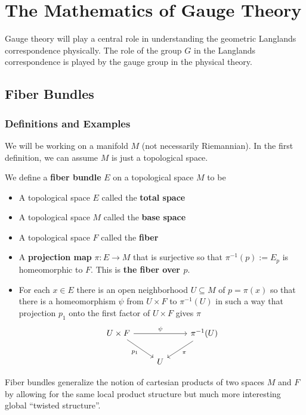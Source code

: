 \chapter{The Mathematics of Gauge Theory\label{ch:gauge}}

	Gauge theory will play a central role in understanding the geometric Langlands correspondence physically. The role of the group $G$ in the Langlands correspondence is played by the gauge group in the physical theory. 

	\section{Fiber Bundles}
	\subsection{Definitions and Examples} %
	\label{sub:definitions_and_examples}
	
	
		We will be working on a manifold $M$ (not necessarily Riemannian). In the first definition, we can assume $M$ is just a topological space. 
	\begin{defn}
		We define a \textbf{fiber bundle} $E$ on a topological space $M$ to be
		\begin{itemize}
			\item A topological space $E$ called the \textbf{total space}
			\item A topological space $M$ called the \textbf{base space}
			\item A topological space $F$ called the \textbf{fiber} 
			\item A \textbf{projection map} $\pi: E \to M$ that is surjective so that $\pi^{-1}(p) := E_p$ is homeomorphic to $F$. This is \textbf{the fiber over $p$}.
			\item For each $x \in E$ there is an open neighborhood $U \subseteq M$ of $p = \pi(x)$ so that there is a homeomorphism $\psi$ from $U \times F$ to $\pi^{-1}(U)$ in such a way that projection $p_1$ onto the first factor of $U \times F$ gives $\pi$
			\[
			\begin{tikzcd}
				U \times F \arrow[rd,swap,"p_1"] \arrow[rr,"\psi"] && \pi^{-1}(U) \arrow[dl,"\pi"]\\
				& U &
			\end{tikzcd}
			\]
		\end{itemize}
	\end{defn}
	Fiber bundles generalize the notion of cartesian products of two spaces $M$ and $F$ by allowing for the same local product structure but much more interesting global ``twisted structure''. 
	
